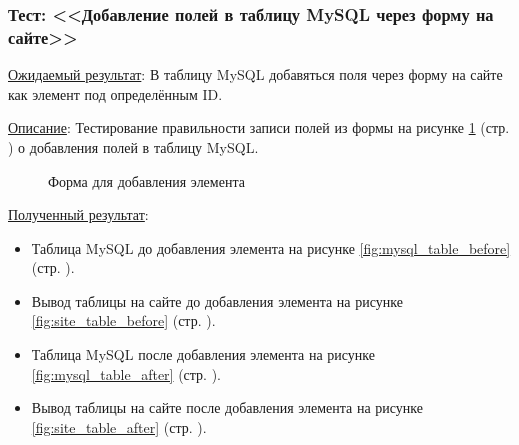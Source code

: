 \subsubsection*{\textbf{Тест}: <<Добавление полей в таблицу MySQL через форму на сайте>>}

\underline{Ожидаемый результат}:
В таблицу MySQL добавяться поля через форму на сайте как элемент под определённым ID.

\underline{Описание}:
Тестирование правильности записи полей из формы
на рисунке \ref{fig:site_form}
(стр. \pageref{fig:site_form})
о добавления полей в таблицу MySQL.

\begin{figure}[!htp]
    \caption{Форма для добавления элемента}
    \label{fig:site_form}
\end{figure}

\underline{Полученный результат}:

\begin{itemize}
    \item Таблица MySQL до добавления элемента
    на рисунке \ref{fig:mysql_table_before}
    (стр. \pageref{fig:mysql_table_before}).

    \item Вывод таблицы на сайте до добавления элемента
    на рисунке \ref{fig:site_table_before}
    (стр. \pageref{fig:site_table_before}).

    \item Таблица MySQL после добавления элемента
    на рисунке \ref{fig:mysql_table_after}
    (стр. \pageref{fig:mysql_table_after}).

    \item Вывод таблицы на сайте после добавления элемента
    на рисунке \ref{fig:site_table_after}
    (стр. \pageref{fig:site_table_after}).
\end{itemize}

